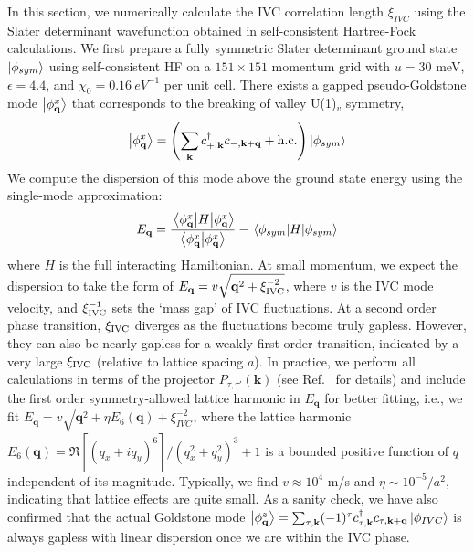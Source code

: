 \documentclass[aps,pra,twocolumn,superscriptaddress,10pt,article,nofootinbib,showpacs,longbibliography]{revtex4-1}
\begin{document}
In this section, we numerically calculate the IVC correlation length $\xi_{IVC}$ using the Slater determinant wavefunction obtained in self-consistent Hartree-Fock calculations.
We first prepare a fully symmetric Slater determinant ground state $\ket{\phi_{sym}}$ using self-consistent HF on a $151 \times 151$ momentum grid with $u = 30$ meV, $\epsilon = 4.4$, and $\chi_0 = \SI{0.16}{eV^{-1}}$ per unit cell.
There exists a gapped pseudo-Goldstone mode $\ket{\phi^x_{\mathbf{q}}}$ that corresponds to the breaking of valley U(1)$_v$ symmetry,
\begin{equation}
    \ket{\phi^x_{\mathbf{q}}} = \left (\sum_{\mathbf{k}} c_{+, \mathbf{k}}^{\dagger} c_{-, \mathbf{k+q}} + \mathrm{h.c.} \right ) \ket{\phi_{sym}}
\end{equation}
We compute the dispersion of this mode above the ground state energy using the single-mode approximation:
\begin{equation}
    E_{\mathbf{q}} = \frac{\mel{\phi^x_{\mathbf{q}}}{H}{\phi^x_{\mathbf{q}}}}{\braket{\phi^x_{\mathbf{q}}}} - \mel{\phi_{sym}}{H}{\phi_{sym}}
\end{equation}
where $H$ is the full interacting Hamiltonian. At small momentum, we expect the dispersion to take the form of $E_{\mathbf{q}} = v \sqrt{\mathbf{q}^2+\xi_{\rm IVC}^{-2}}$, where $v$ is the IVC mode velocity, and $\xi^{-1}_{\rm IVC}$ sets the `mass gap' of IVC fluctuations. 
At a second order phase transition, $\xi_{\rm IVC}$ diverges as the fluctuations become truly gapless. However, they can also be nearly gapless for a weakly first order transition, indicated by a very large $\xi_{\rm IVC}$ (relative to lattice spacing $a$).
In practice, we perform all calculations in terms of the projector $P_{\tau,\tau'}(\mathbf{k})$ (see Ref.~ for details) and include the first order symmetry-allowed lattice harmonic in $E_{\mathbf{q}}$ for better fitting, i.e., we fit $E_{\mathbf{q}} =  v \sqrt{\mathbf{q}^2+ \eta E_6(\mathbf{q}) + \xi_{IVC}^{-2}}$, where the lattice harmonic  $E_6(\mathbf{q}) = \Re [(q_x + i q_y)^6]/(q_x^2 + q_y^2)^3 + 1$ is a bounded positive function of $q$ independent of its magnitude. 
Typically, we find $v \approx 10^{4}$ m/s and $\eta \sim 10^{-5}/a^2$, indicating that lattice effects are quite small.  
As a sanity check, we have also confirmed that the actual Goldstone mode $\ket{\phi^z_{\mathbf{q}}} = \sum_{\tau, \mathbf{k}} (-1)^{\tau} c_{\tau, \mathbf{k}}^{\dagger} c_{\tau, \mathbf{k+q}} \ket{\phi_{IVC}}$ is always gapless with linear dispersion once we are within the IVC phase.
\end{document}
